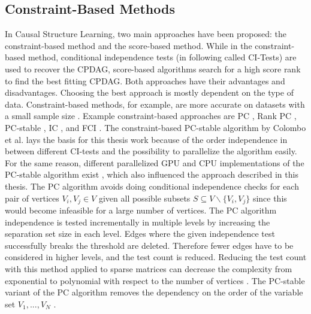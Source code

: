 \subsection{Constraint-Based Methods}
In Causal Structure Learning, two main approaches have been proposed: the constraint-based method and the score-based method. While in the constraint-based method, conditional independence tests (in following called CI-Tests) are used to recover the CPDAG, score-based algorithms search for a high score rank to find the best fitting CPDAG. Both approaches have their advantages and disadvantages. Choosing the best approach is mostly dependent on the type of data. Constraint-based methods, for example, are more accurate on datasets with a small sample size \cite{scutariBayesianNetworkConstraintBased2017}. Example constraint-based approaches are PC \cite{spirtesCausationPredictionSearch1993}, Rank PC \cite{harrisPCAlgorithmNonparanormal}, PC-stable \cite{colomboOrderIndependentConstraintBasedCausal}, IC \cite{vermaEquivalenceSynthesisCausal1990}, and FCI \cite{spirtesCausationPredictionSearch1993}.
The constraint-based PC-stable algorithm by Colombo et al. \cite{colomboOrderIndependentConstraintBasedCausal} lays the basis for this thesis work because of the order independence in between different CI-tests and the possibility to parallelize the algorithm easily. For the same reason, different parallelized GPU and CPU implementations of the PC-stable algorithm exist \cite{schmidtLoadBalancedParallelConstraintBased2019,schmidtOrderIndependentConstraintBasedCausal2018,zarebavaniCuPCCUDAbasedParallel2018}, which also influenced the approach described in this thesis.
The PC algorithm avoids doing conditional independence checks for each pair of vertices $V_i, V_j \in V$ given all possible subsets $S \subseteq V \backslash \{V_i, V_j\}$ \cite{pearlTheoryInferredCausation1995} since this would become infeasible for a large number of vertices. The PC algorithm independence is tested incrementally in multiple levels by increasing the separation set size in each level. Edges where the given independence test successfully breaks the threshold are deleted. Therefore fewer edges have to be considered in higher levels, and the test count is reduced. Reducing the test count with this method applied to sparse matrices can decrease the complexity from exponential to polynomial with respect to the number of vertices \cite{kalischEstimatingHighDimensionalDirected2007}.
The PC-stable variant of the PC algorithm removes the dependency on the order of the variable set $V_1, ...,V_N$ \cite{colomboOrderIndependentConstraintBasedCausal,schmidtOrderIndependentConstraintBasedCausal2018}.

